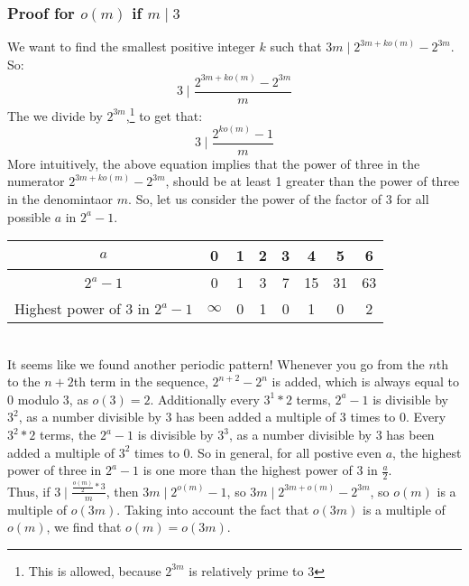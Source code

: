 \documentclass{article}
\begin{document}
  \subsubsection{Proof for $o(m)$ if $m \mid 3$}
  We want to find the smallest positive integer $k$ such that $3m \mid 2^{3m + ko(m)} - 2^{3m}$. So:
  \begin{equation}
    3 \mid \frac{2^{3m + ko(m)} - 2^{3m}}{m}
  \end{equation}
   The we divide by $2^{3m}$,\footnote{This is allowed, because $2^{3m}$ is relatively prime to 3} to get that:
  \begin{equation}
    3 \mid \frac{2^{ko(m)}-1}{m}
  \end{equation}
  More intuitively, the above equation implies that the power of three in the numerator $2^{3m + ko(m)}-2^{3m}$, should be at least 1 greater than the power of three in the denomintaor $m$. So, let us consider the power of the factor of 3 for all possible $a$ in $2^a-1$.\\
  \begin{tabular} {|c|c|c|c|c|c|c|c|}
    \hline $a$                             & 0 & 1 & 2 & 3 & 4  &  5 & 6 \\
    \hline $2^a-1$                         & 0 & 1 & 3 & 7 & 15 & 31 & 63\\
    \hline Highest power of 3 in $2^a-1$   & $\infty$ & 0 & 1 & 0 & 1  & 0  & 2 \\
    \hline 
  \end{tabular}\\
  
  It seems like we found another periodic pattern! Whenever you go from the $n$th to the $n+2$th term in the sequence, $2^{n+2} - 2^n$ is added, which is always equal to 0 modulo 3, as $o(3) = 2$. Additionally every $3^1*2$ terms, $2^a-1$ is divisible by $3^2$, as a number divisible by 3 has been added a multiple of 3 times to 0. Every $3^2*2$ terms, the $2^a-1$ is divisible by $3^3$, as a number divisible by 3 has been added a multiple of $3^2$ times to 0. So in general, for all postive even $a$, the highest power of three in $2^a - 1$ is one more than the highest power of 3 in $\frac{a}{2}$.\\

  Thus, if $3 \mid \frac{\frac{o(m)}{2} * 3}{m}$, then $3m \mid 2^{o(m)}-1$, so $3m \mid 2^{3m + o(m)}-2^{3m}$, so $o(m)$ is a multiple of $o(3m)$. Taking into account the fact that $o(3m)$ is a multiple of $o(m)$, we find that $o(m)= o(3m)$.\\
\end{document}
